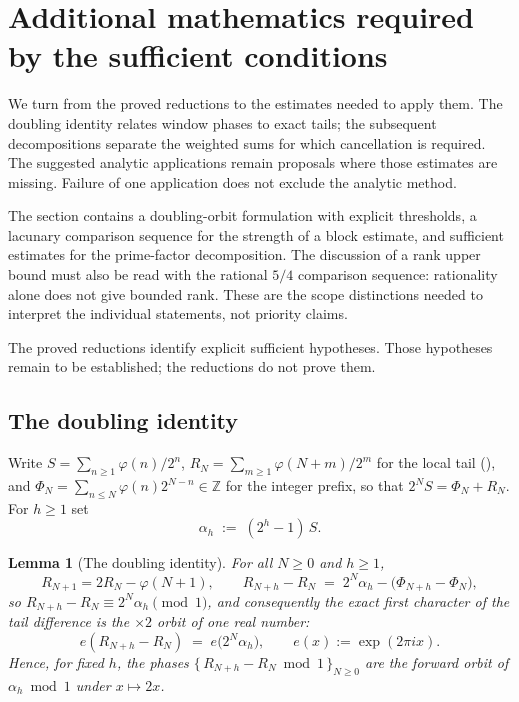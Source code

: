 \documentclass[11pt]{article}
\theoremstyle{plain}
\newtheorem{lem}[thm]{Lemma}
\theoremstyle{definition}
\theoremstyle{remark}
\newcommand{\lean}[2]{\leanlink{#2}}
\newcommand{\Z}{\mathbb{Z}}
\begin{document}
\section{Additional mathematics required by the sufficient conditions}

We turn from the proved reductions to the estimates needed to apply
them. The doubling identity relates window phases to exact tails;
the subsequent decompositions separate the weighted sums for which
cancellation is required. The suggested analytic applications remain
proposals where those estimates are missing. Failure of one application
does not exclude the analytic method.

The section contains a doubling-orbit formulation with explicit thresholds,
a lacunary comparison sequence for the strength of a block estimate,
and sufficient estimates for the prime-factor decomposition. The discussion of a rank upper bound
must also be read with the rational $5/4$ comparison sequence: rationality
alone does not give bounded rank. These are the scope distinctions needed
to interpret the individual statements, not priority claims.


The proved reductions identify explicit sufficient hypotheses. Those
hypotheses remain to be established; the reductions do not prove them.

\subsection{The doubling identity}

Write $S=\sum_{n\ge 1}\varphi(n)/2^n$, $R_N=\sum_{m\ge 1}\varphi(N+m)/2^m$
for the local tail
(\lean{Erdos249257.\allowbreak TotientTailPeriodKiller.\allowbreak totientTail}{TotientTailPeriodKiller.lean:57}),
and $\Phi_N=\sum_{n\le N}\varphi(n)2^{N-n}\in\Z$ for the integer prefix, so
that $2^N S=\Phi_N+R_N$. For $h\ge 1$ set
\[
  \alpha_h \;:=\; (2^h-1)\,S .
\]

\begin{lem}[The doubling identity]\label{lem:orbit}
For all $N\ge 0$ and $h\ge 1$,
\[
  R_{N+1}=2R_N-\varphi(N+1),
  \qquad
  R_{N+h}-R_N \;=\; 2^N\alpha_h-\bigl(\Phi_{N+h}-\Phi_N\bigr),
\]
so $R_{N+h}-R_N \equiv 2^N\alpha_h \pmod 1$, and consequently the exact
first character of the tail difference is the $\times 2$ orbit of one real
number:
\[
  e(R_{N+h}-R_N)
  \;=\; e\bigl(2^N\alpha_h\bigr),
  \qquad e(x):=\exp(2\pi i x).
\]
Hence, for fixed $h$, the phases $\{\,R_{N+h}-R_N \bmod 1\,\}_{N\ge 0}$ are
the forward orbit of $\alpha_h \bmod 1$ under $x\mapsto 2x$.
\end{lem}
\end{document}
